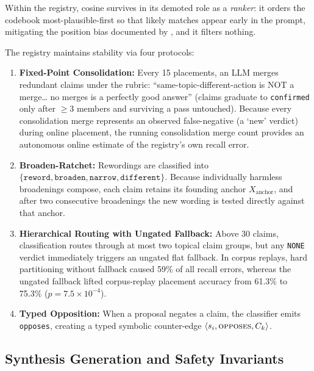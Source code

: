 \documentclass{article}
\begin{document}
Within the registry, cosine survives in its demoted role as a \emph{ranker}: it orders the codebook most-plausible-first so that likely matches appear early in the prompt, mitigating the position bias documented by \citet{liu2024lost}, and it filters nothing.

The registry maintains stability via four protocols:

\begin{enumerate}
\item \textbf{Fixed-Point Consolidation:} Every 15 placements, an LLM merges redundant claims under the rubric: ``same-topic-different-action is NOT a merge\ldots{} no merges is a perfectly good answer'' (claims graduate to \texttt{confirmed} only after $\geq 3$ members and surviving a pass untouched). Because every consolidation merge represents an observed false-negative (a `new' verdict) during online placement, the running consolidation merge count provides an autonomous online estimate of the registry's own recall error.
\item \textbf{Broaden-Ratchet:} Rewordings are classified into $\{\texttt{reword}, \texttt{broaden}, \texttt{narrow}, \texttt{different}\}$. Because individually harmless broadenings compose, each claim retains its founding anchor $X_{\mathrm{anchor}}$, and after two consecutive broadenings the new wording is tested directly against that anchor.
\item \textbf{Hierarchical Routing with Ungated Fallback:} Above 30 claims, classification routes through at most two topical claim groups, but any \texttt{NONE} verdict immediately triggers an ungated flat fallback. In corpus replays, hard partitioning without fallback caused 59\% of all recall errors, whereas the ungated fallback lifted corpus-replay placement accuracy from 61.3\% to 75.3\% ($p = 7.5 \times 10^{-4}$).
\item \textbf{Typed Opposition:} When a proposal negates a claim, the classifier emits \texttt{opposes}, creating a typed symbolic counter-edge $\langle s_i, \textsc{opposes}, C_k \rangle$.
\end{enumerate}

\subsection{Synthesis Generation and Safety Invariants}
\end{document}
